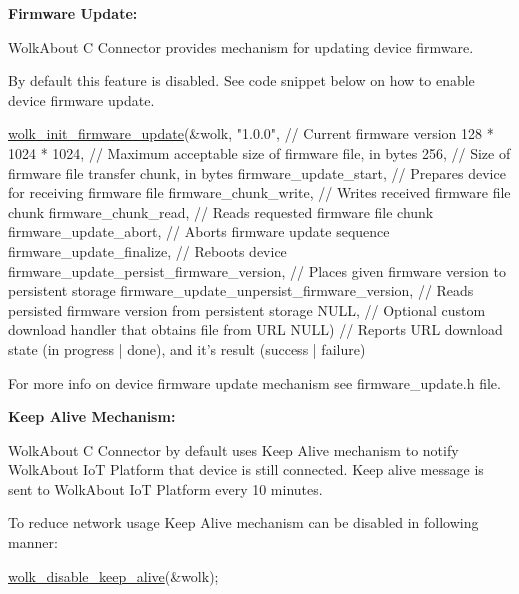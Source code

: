 {\bfseries Firmware Update\+:}

Wolk\+About C Connector provides mechanism for updating device firmware.

By default this feature is disabled. See code snippet below on how to enable device firmware update.


\begin{DoxyCode}
\hyperlink{wolk__connector_8h_a077b59e55a348cd2601bb269a04c77d6}{wolk\_init\_firmware\_update}(&wolk,
                          \textcolor{stringliteral}{"1.0.0"},                                      \textcolor{comment}{// Current firmware version}
                          128 * 1024 * 1024,                            \textcolor{comment}{// Maximum acceptable size of
       firmware file, in bytes}
                          256,                                          \textcolor{comment}{// Size of firmware file transfer
       chunk, in bytes}
                          firmware\_update\_start,                        \textcolor{comment}{// Prepares device for receiving
       firmware file}
                          firmware\_chunk\_write,                         \textcolor{comment}{// Writes received firmware file
       chunk}
                          firmware\_chunk\_read,                          \textcolor{comment}{// Reads requested firmware file
       chunk}
                          firmware\_update\_abort,                        \textcolor{comment}{// Aborts firmware update sequence}
                          firmware\_update\_finalize,                     \textcolor{comment}{// Reboots device}
                          firmware\_update\_persist\_firmware\_version,     \textcolor{comment}{// Places given firmware version to
       persistent storage}
                          firmware\_update\_unpersist\_firmware\_version,   \textcolor{comment}{// Reads persisted firmware version
       from persistent storage}
                          NULL,                                         \textcolor{comment}{// Optional custom download handler
       that obtains file from URL}
                          NULL)                                         \textcolor{comment}{// Reports URL download state (in
       progress | done), and it's result (success | failure)}
\end{DoxyCode}


For more info on device firmware update mechanism see {\ttfamily firmware\+\_\+update.\+h} file.

{\bfseries Keep Alive Mechanism\+:}

Wolk\+About C Connector by default uses Keep Alive mechanism to notify Wolk\+About IoT Platform that device is still connected. Keep alive message is sent to Wolk\+About IoT Platform every 10 minutes.

To reduce network usage Keep Alive mechanism can be disabled in following manner\+:


\begin{DoxyCode}
\hyperlink{wolk__connector_8h_ac04ee6d0e9cac773f77a57b89383c715}{wolk\_disable\_keep\_alive}(&wolk);
\end{DoxyCode}
 
